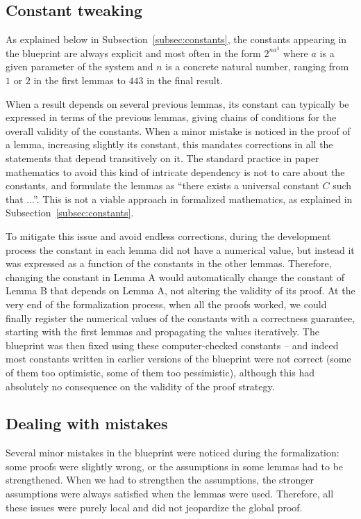 \documentclass[12pt]{amsart}
\begin{document}
\subsection{Constant tweaking} As explained below in
Subsection~\ref{subsec:constants}, the constants appearing in the blueprint
are always explicit and most often in the form $2^{n a^3}$ where $a$ is a
given parameter of the system and $n$ is a concrete natural number, ranging
from $1$ or $2$ in the first lemmas to $443$ in the final result.

When a result depends on several previous lemmas, its constant can typically
be expressed in terms of the previous lemmas, giving chains of conditions for
the overall validity of the constants. When a minor mistake is noticed in the
proof of a lemma, increasing slightly its constant, this mandates corrections
in all the statements that depend transitively on it. The standard practice
in paper mathematics to avoid this kind of intricate dependency is not to
care about the constants, and formulate the lemmas as ``there exists a
universal constant $C$ such that ...''. This is not a viable approach in
formalized mathematics, as explained in Subsection~\ref{subsec:constants}.

To mitigate this issue and avoid endless corrections, during the development
process the constant in each lemma did not have a numerical value, but
instead it was expressed as a function of the constants in the other lemmas.
Therefore, changing the constant in Lemma A would automatically change the
constant of Lemma B that depends on Lemma A, not altering the validity of its
proof. At the very end of the formalization process, when all the proofs
worked, we could finally register the numerical values of the constants with
a correctness guarantee, starting with the first lemmas and propagating the
values iteratively. The blueprint was then fixed using these computer-checked
constants -- and indeed most constants written in earlier versions of the
blueprint were not correct (some of them too optimistic, some of them too
pessimistic), although this had absolutely no consequence on the validity of
the proof strategy.


\subsection{Dealing with mistakes}\label{subsec:blueprint_mistakes}

Several minor mistakes in the blueprint were noticed during the
formalization: some proofs were slightly wrong, or the assumptions in some
lemmas had to be strengthened. When we had to strengthen the assumptions, the
stronger assumptions were always satisfied when the lemmas were used.
Therefore, all these issues were purely local and did not jeopardize the
global proof.
\end{document}
